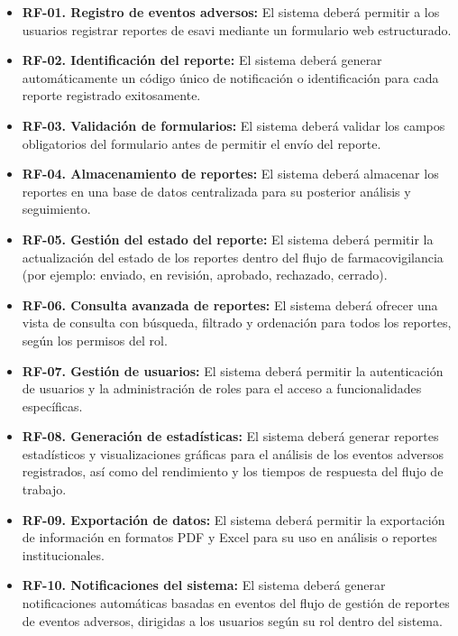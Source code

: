 \begin{itemize}

\item \textbf{RF-01. Registro de eventos adversos:}  
El sistema deberá permitir a los usuarios registrar reportes de \gls{esavi} mediante un formulario web estructurado.

\item \textbf{RF-02. Identificación del reporte:}  
El sistema deberá generar automáticamente un código único de notificación o identificación para cada reporte registrado exitosamente.

\item \textbf{RF-03. Validación de formularios:}  
El sistema deberá validar los campos obligatorios del formulario antes de permitir el envío del reporte.

\item \textbf{RF-04. Almacenamiento de reportes:}  
El sistema deberá almacenar los reportes en una base de datos centralizada para su posterior análisis y seguimiento.

\item \textbf{RF-05. Gestión del estado del reporte:}  
El sistema deberá permitir la actualización del estado de los reportes dentro del flujo de farmacovigilancia (por ejemplo: enviado, en revisión, aprobado, rechazado, cerrado).

\item \textbf{RF-06. Consulta avanzada de reportes:}  
El sistema deberá ofrecer una vista de consulta con búsqueda, filtrado y ordenación para todos los reportes, según los permisos del rol.

\item \textbf{RF-07. Gestión de usuarios:}  
El sistema deberá permitir la autenticación de usuarios y la administración de roles para el acceso a funcionalidades específicas.

\item \textbf{RF-08. Generación de estadísticas:}  
El sistema deberá generar reportes estadísticos y visualizaciones gráficas para el análisis de los eventos adversos registrados, así como del rendimiento y los tiempos de respuesta del flujo de trabajo.

\item \textbf{RF-09. Exportación de datos:}  
El sistema deberá permitir la exportación de información en formatos PDF y Excel para su uso en análisis o reportes institucionales.

\item \textbf{RF-10. Notificaciones del sistema:}  
El sistema deberá generar notificaciones automáticas basadas en eventos del flujo de gestión de reportes de eventos adversos, dirigidas a los usuarios según su rol dentro del sistema.


\end{itemize}
